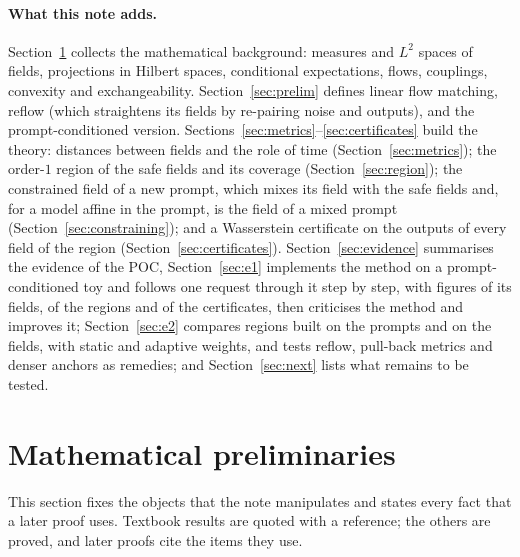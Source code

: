\documentclass{article}
\theoremstyle{plain}
\theoremstyle{remark}
\begin{document}
\paragraph{What this note adds.}
Section~\ref{sec:math} collects the mathematical background: measures and $L^2$ spaces of fields, projections in Hilbert
spaces, conditional expectations, flows, couplings, convexity and exchangeability. Section~\ref{sec:prelim} defines linear
flow matching, reflow (which straightens its fields by re-pairing noise and outputs), and the prompt-conditioned version.
Sections~\ref{sec:metrics}--\ref{sec:certificates} build the theory: distances between fields
and the role of time (Section~\ref{sec:metrics}); the order-$1$ region of the safe fields and its
coverage (Section~\ref{sec:region}); the constrained field of a new prompt, which mixes its field
with the safe fields and, for a model affine in the prompt, is the field of a mixed prompt
(Section~\ref{sec:constraining}); and a Wasserstein certificate on the outputs of every field of
the region (Section~\ref{sec:certificates}). Section~\ref{sec:evidence} summarises the evidence of the POC,
Section~\ref{sec:e1} implements the method on a prompt-conditioned toy and follows one request through it step by
step, with figures of its fields, of the regions and of the certificates, then criticises the method and improves it;
Section~\ref{sec:e2} compares regions built on the prompts and on the fields, with static and adaptive weights, and tests
reflow, pull-back metrics and denser anchors as remedies; and
Section~\ref{sec:next} lists what remains to be tested.

\section{Mathematical preliminaries}\label{sec:math}

This section fixes the objects that the note manipulates and states every fact that a later proof uses. Textbook
results are quoted with a reference; the others are proved, and later proofs cite the items they use.
\end{document}
